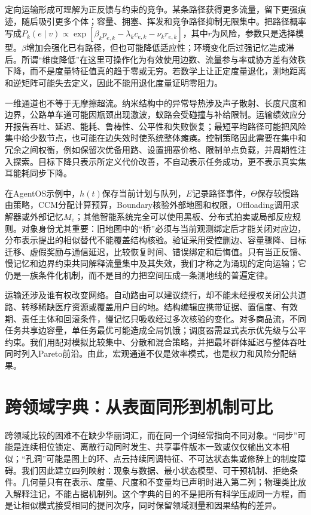 定向运输形成可理解为正反馈与约束的竞争。某条路径获得更多流量，留下更强痕迹，随后吸引更多个体；容量、拥塞、挥发和竞争路径抑制无限集中。把路径概率写成$P_k(e\mid v)\propto\exp[\beta_k p_{e,k}-\lambda_k c_{e,k}-\nu_k r_{e,k}]$，其中$r$为风险，参数只是选择模型。$\beta$增加会强化已有路径，但也可能降低适应性；环境变化后过强记忆造成滞后。所谓“维度降低”在这里可操作化为有效使用边数、流量参与率或协方差有效秩下降，而不是度量特征值真的趋于零或无穷。若数学上让正定度量退化，测地距离和逆矩阵可能失去定义，因此不能用退化度量证明零阻力。

一维通道也不等于无摩擦超流。纳米结构中的异常导热涉及声子散射、长度尺度和边界，公路单车道可能因瓶颈出现激波，蚁路会受碰撞与补给限制。运输绩效应分开报告吞吐、延迟、能耗、鲁棒性、公平性和失败恢复；最短平均路径可能把风险集中给少数节点，也可能在边失效时使系统整体瘫痪。控制策略因此需要在集中和冗余之间权衡，例如保留次优备用路、设置拥塞价格、限制单点负载，并周期性注入探索。目标下降只表示所定义代价改善，不自动表示任务成功，更不表示真实焦耳能耗同步下降。

在AgentOS示例中，$h(t)$保存当前计划与队列，$E$记录路径事件，$\Theta$保存较慢路由策略，CCM分配计算预算，Boundary核验外部地图和权限，Offloading调用求解器或外部记忆$M_e$；其他智能系统完全可以使用黑板、分布式拍卖或局部反应规则。对象身份尤其重要：旧地图中的“桥”必须与当前观测绑定后才能关闭对应边，分布表示提出的相似替代不能覆盖结构核验。验证采用受控删边、容量骤降、目标迁移、虚假奖励与通信延迟，比较恢复时间、错误绑定和后悔值。只有当正反馈、慢记忆和边界约束共同解释流量集中及其失效，我们才称之为涌现的定向运输；它仍是一族条件化机制，而不是目的力把空间压成一条测地线的普遍定律。

运输还涉及谁有权改变网络。自动路由可以建议绕行，却不能未经授权关闭公共道路、转移稀缺医疗资源或覆盖用户目的地。结构编辑应携带证据、置信度、有效期、责任主体和回滚条件，慢记忆只吸收经过多次核验的变化。对多商品流，不同任务共享边容量，单任务最优可能造成全局饥饿；调度器需显式表示优先级与公平约束。我们用配对模拟比较集中、分散和混合策略，并把最坏群体延迟与整体吞吐同时列入Pareto前沿。由此，宏观通道不仅是效率模式，也是权力和风险分配结果。

\section{跨领域字典：从表面同形到机制可比}
\label{sec:emergence_dictionary}

跨领域比较的困难不在缺少华丽词汇，而在同一个词经常指向不同对象。“同步”可能是连续相位锁定、离散行动同时发生、共享事件版本一致或仅仅输出文本相似；“孔洞”可能是图上的环、点云持续同调特征、不可达状态集或修辞上的制度障碍。我们因此建立四列映射：现象与数据、最小状态模型、可干预机制、拒绝条件。几何量只有在表示、度量、尺度和不变量均已声明时进入第二列；物理类比放入解释注记，不能占据机制列。这个字典的目的不是把所有科学压成同一方程，而是让相似模式接受相同的提问次序，同时保留领域测量和因果结构的差异。

